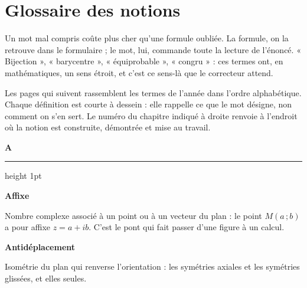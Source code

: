 \chapter{Glossaire des notions}

Un mot mal compris coûte plus cher qu'une formule oubliée. La formule, on la
retrouve dans le formulaire ; le mot, lui, commande toute la lecture de
l'énoncé. « Bijection », « barycentre », « équiprobable », « congru » : ces
termes ont, en mathématiques, un sens étroit, et c'est ce sens-là que le
correcteur attend.

Les pages qui suivent rassemblent les termes de l'année dans l'ordre
alphabétique. Chaque définition est courte à dessein : elle rappelle ce que
le mot désigne, non comment on s'en sert. Le numéro du chapitre indiqué à
droite renvoie à l'endroit où la notion est construite, démontrée et mise au
travail.

\newcommand{\glolettre}[1]{%
  \par\vspace{1.15em}\noindent
  \begingroup\sffamily\bfseries\large\color{bmtAccent}#1\endgroup
  \hspace{0.5em}%
  {\color{bmtGrisClair}\leaders\hrule height 1pt\hfill\kern0pt}%
  \par\vspace{0.35em}}

\newcommand{\glo}[2]{%
  \par\vspace{0.5em}\noindent
  {\sffamily\bfseries\small\color{bmtAccent}#1}%
  \hspace{0.45em}{\sffamily\footnotesize\color{bmtGris}ch.~#2}%
  \par\vspace{0.05em}\noindent\ignorespaces}

\glolettre{A}

\glo{Affixe}{12}
Nombre complexe associé à un point ou à un vecteur du plan : le point
$M(a\,;b)$ a pour affixe $z = a+ib$. C'est le pont qui fait passer d'une
figure à un calcul.

\glo{Antidéplacement}{14}
Isométrie du plan qui renverse l'orientation : les symétries axiales et les
symétries glissées, et elles seules.

